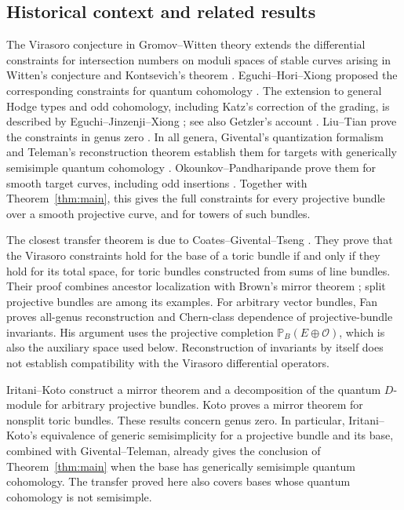 \subsection{Historical context and related results}

The Virasoro conjecture in Gromov--Witten theory extends the
differential constraints for intersection numbers on moduli
spaces of stable curves arising in Witten's conjecture and
Kontsevich's theorem \cite{Witten,Kontsevich}.
Eguchi--Hori--Xiong proposed the corresponding constraints
for quantum cohomology \cite{EHX}.
The extension to general Hodge types and odd cohomology,
including Katz's correction of the grading, is described by
Eguchi--Jinzenji--Xiong \cite{EJX}; see also
Getzler's account \cite{GetzlerVirasoro}.
Liu--Tian prove the constraints in genus zero \cite{LiuTian}.
In all genera, Givental's quantization formalism and Teleman's
reconstruction theorem establish them for targets with
generically semisimple quantum cohomology
\cite{GiventalQuant,GiventalSemisimple,Teleman}.
Okounkov--Pandharipande prove them for smooth target curves,
including odd insertions \cite{OkounkovPandharipande}.
Together with Theorem~\ref{thm:main}, this gives the full
constraints for every projective bundle over a smooth
projective curve, and for towers of such bundles.

The closest transfer theorem is due to
Coates--Givental--Tseng \cite{CGT}. They prove that the
Virasoro constraints hold for the base of a toric bundle if
and only if they hold for its total space, for toric bundles
constructed from sums of line bundles. Their proof combines
ancestor localization with Brown's mirror theorem
\cite{Brown}; split projective bundles are among its examples.
For arbitrary vector bundles, Fan \cite{Fan} proves all-genus
reconstruction and Chern-class dependence of projective-bundle
invariants. His argument uses the projective completion
$\mathbb P_B(E\oplus\mathcal O)$, which is also the auxiliary
space used below. Reconstruction of invariants by itself
does not establish compatibility with the Virasoro
differential operators.

Iritani--Koto \cite{IritaniKoto} construct a mirror theorem
and a decomposition of the quantum $D$-module for arbitrary
projective bundles. Koto \cite{Koto} proves a mirror theorem
for nonsplit toric bundles. These results concern genus zero.
In particular, Iritani--Koto's equivalence of generic
semisimplicity for a projective bundle and its base,
combined with Givental--Teleman, already gives the conclusion
of Theorem~\ref{thm:main} when the base has generically
semisimple quantum cohomology. The transfer proved here
also covers bases whose quantum cohomology is not
semisimple.

